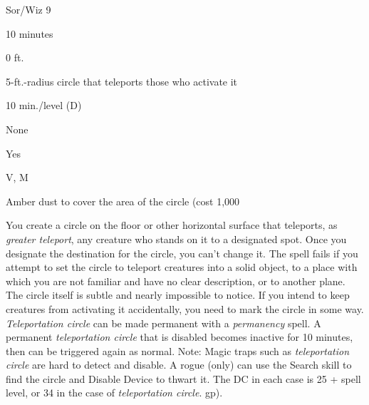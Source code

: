 
\begin{description*}
\item[Level:] Sor/Wiz 9
\item[Casting Time:] 10 minutes
\item[Range:] 0 ft.
\item[Effect:] 5-ft.-radius circle that teleports those who activate it
\item[Duration:] 10 min./level (D)
\item[Saving Throw:] None
\item[Spell Resistance:] Yes
\item[Components:] V, M
\item[Arcane Material Component:] Amber dust to cover the area of the circle (cost 1,000
\end{description*}

You create a circle on the floor or other horizontal surface that teleports, as
\textit{greater teleport}, any creature who stands on it to a designated spot.
Once you designate the destination for the circle, you can't change it. The spell
fails if you attempt to set the circle to teleport creatures into a solid object,
to a place with which you are not familiar and have no clear description, or to
another plane.
The circle itself is subtle and nearly impossible to notice. If you intend to keep
creatures from activating it accidentally, you need to mark the circle in some
way.
\textit{Teleportation circle} can be made permanent with a \textit{permanency} spell.
A permanent \textit{teleportation circle} that is disabled becomes inactive for
10 minutes, then can be triggered again as normal.
Note: Magic traps such as \textit{teleportation circle} are hard to detect
and disable. A rogue (only) can use the Search skill to find the circle and Disable
Device to thwart it. The DC in each case is 25 + spell level, or 34 in the case
of \textit{teleportation circle}.
gp).